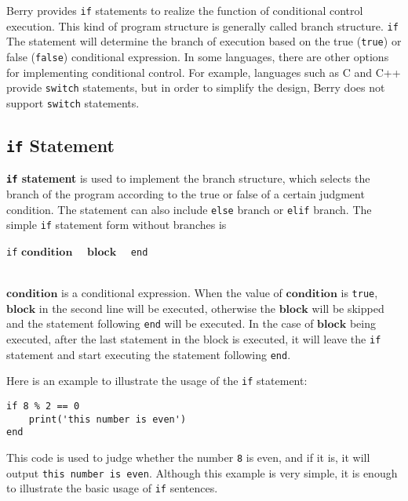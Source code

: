 Berry provides \texttt{if} statements to realize the function of conditional control execution. This kind of program structure is generally called branch structure. \texttt{if} The statement will determine the branch of execution based on the true (\texttt{true}) or false (\texttt{false}) conditional expression. In some languages, there are other options for implementing conditional control. For example, languages   such as C and C++ provide \texttt{switch} statements, but in order to simplify the design, Berry does not support \texttt{switch} statements.

\subsection{\texttt{if} Statement}

\textbf{\texttt{if} statement} is used to implement the branch structure, which selects the branch of the program according to the true or false of a certain judgment condition. The statement can also include \texttt{else} branch or \texttt{elif} branch. The simple \texttt{if} statement form without branches is
\begin{algorithm}
    \texttt{if} $\bm{condition}$ \ \
    \qquad $\bm{block}$ \ \
    \texttt{end}
\end{algorithm}\vspace{-0.6em}\\
$\bm{condition}$ is a conditional expression. When the value of $\bm{condition}$ is \texttt{true}, $\bm{block}$ in the second line will be executed, otherwise the $\bm{block}$ will be skipped and the statement following \texttt{end} will be executed. In the case of $\bm{block}$ being executed, after the last statement in the block is executed, it will leave the \texttt{if} statement and start executing the statement following \texttt{end}.

Here is an example to illustrate the usage of the \texttt{if} statement:
\begin{lstlisting}[language=berry, numbers=none]
if 8 % 2 == 0
    print('this number is even')
end
\end{lstlisting}
This code is used to judge whether the number \texttt{8} is even, and if it is, it will output \texttt{this number is even}. Although this example is very simple, it is enough to illustrate the basic usage of \texttt{if} sentences.

